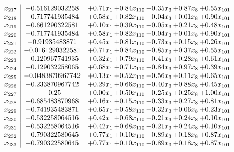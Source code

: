 \documentclass[8pt]{article}
\begin{document}
\[\begin{array}{c| c c@{\hskip 2pt} c@{\hskip 2pt} c@{\hskip 2pt} c@{\hskip 2pt} c@{\hskip 2pt} }
 x_{217}   &  -0.516129032258 & +  0.71 x_{1} & +  0.84 x_{110} & +  0.35 x_{3} & +  0.87 x_{8} & +  0.55 x_{101}\\
 x_{218}   &  -0.717741935484 & +  0.58 x_{1} & +  0.82 x_{110} & +  0.04 x_{3} & +  0.01 x_{8} & +  0.90 x_{101}\\
 x_{219}   &  -0.661290322581 & +  0.10 x_{1} & +  0.39 x_{110} & +  0.05 x_{3} & +  0.21 x_{8} & +  0.48 x_{101}\\
 x_{220}   &  -0.717741935484 & +  0.58 x_{1} & +  0.82 x_{110} & +  0.04 x_{3} & +  0.01 x_{8} & +  0.90 x_{101}\\
 x_{221}   &  -0.91935483871 & +  0.45 x_{1} & +  0.81 x_{110} & +  0.73 x_{3} & +  0.15 x_{8} & +  0.26 x_{101}\\
 x_{222}   &  -0.0161290322581 & +  0.71 x_{1} & +  0.84 x_{110} & +  0.85 x_{3} & +  0.37 x_{8} & +  0.55 x_{101}\\
 x_{223}   &  -0.120967741935 & +  0.32 x_{1} & +  0.79 x_{110} & +  0.41 x_{3} & +  0.28 x_{8} & +  0.61 x_{101}\\
 x_{224}   &  -0.129032258065 & +  0.68 x_{1} & +  0.71 x_{110} & +  0.84 x_{3} & +  0.97 x_{8} & +  0.39 x_{101}\\
 x_{225}   &  -0.0483870967742 & +  0.13 x_{1} & +  0.52 x_{110} & +  0.56 x_{3} & +  0.11 x_{8} & +  0.65 x_{101}\\
 x_{226}   &  -0.233870967742 & +  0.29 x_{1} & +  0.66 x_{110} & +  0.40 x_{3} & +  0.88 x_{8} & +  0.45 x_{101}\\
 x_{227}   &  -0.25 & +  0.00 x_{1} & +  0.50 x_{110} & +  0.25 x_{3} & +  0.25 x_{8} & +  1.00 x_{101}\\
 x_{228}   &  -0.685483870968 & +  0.16 x_{1} & +  0.15 x_{110} & +  0.33 x_{3} & +  0.27 x_{8} & +  0.81 x_{101}\\
 x_{229}   &  -0.741935483871 & +  0.65 x_{1} & +  0.58 x_{110} & +  0.32 x_{3} & +  0.06 x_{8} & +  0.23 x_{101}\\
 x_{230}   &  -0.532258064516 & +  0.42 x_{1} & +  0.68 x_{110} & +  0.21 x_{3} & +  0.24 x_{8} & +  0.10 x_{101}\\
 x_{231}   &  -0.532258064516 & +  0.42 x_{1} & +  0.68 x_{110} & +  0.21 x_{3} & +  0.24 x_{8} & +  0.10 x_{101}\\
 x_{232}   &  -0.790322580645 & +  0.77 x_{1} & +  0.10 x_{110} & +  0.89 x_{3} & +  0.18 x_{8} & +  0.87 x_{101}\\
 x_{233}   &  -0.790322580645 & +  0.77 x_{1} & +  0.10 x_{110} & +  0.89 x_{3} & +  0.18 x_{8} & +  0.87 x_{101}\\

\end{array}\]
\end{document}
